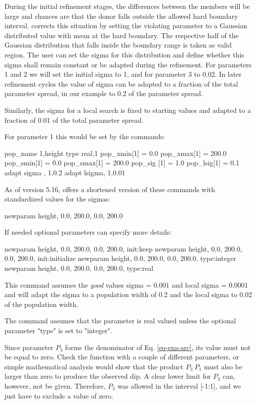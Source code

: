 During the initial refinement stages, the differences between the 
members will be large and chances are that the donor falls outside 
the allowed hard boundary interval. \Diffev corrects this situation by 
setting the violating parameter to a Gaussian distributed value 
with mean at the hard boundary. The respective half of the Gaussian
distribution that falls inside the boundary range is taken as valid
region. The user can set the sigma for this distribution and define
whether this sigma shall remain constant or be adapted during the
refinement. For parameters 1 and 2 we will set the initial sigma to
1, and for parameter 3 to 0.02. In later refinement cycles the
value of sigma can be adapted to a fraction of the total parameter 
spread, in our example to 0.2 of the parameter spread. 

Similarly, the sigma for a local search is fixed to starting values 
and adapted to a fraction of 0.01 of the total parameter spread.

For parameter 1 this would be set by the commands:
\begin{MacVerbatim}
   pop_name    1,height
   type real,1
   pop_xmin[1] =   0.0
   pop_xmax[1] = 200.0
   pop_smin[1] =   0.0
   pop_smax[1] = 200.0
   pop_sig [1] =   1.0
   pop_lsig[1] =   0.1
   adapt sigma , 1,0.2
   adapt lsigma, 1,0.01
\end{MacVerbatim}

As of version 5.16, \Diffev offers a shortened version of these 
commands with standardized values for the sigmas:
\begin{MacVerbatim}
   newparam height, 0.0, 200.0, 0.0, 200.0
\end{MacVerbatim}

If needed optional parameters can specify more details:
\begin{MacVerbatim}
   newparam height, 0.0, 200.0, 0.0, 200.0, init:keep
   newparam height, 0.0, 200.0, 0.0, 200.0, init:initialize
   newparam height, 0.0, 200.0, 0.0, 200.0, type:integer
   newparam height, 0.0, 200.0, 0.0, 200.0, type:real
\end{MacVerbatim}

This command assumes the {\it good} values sigma = 0.001 and 
local sigma = 0.0001 and will adapt the sigma to a population 
width of 0.2 and the local sigma to 0.02 of the population width.

The command assumes that the parameter is real valued unless the
optional parameter "type" is set to "integer".

Since parameter $P_{3}$ forms the denominator of Eq. \ref{eq-exa-arc},
its value must not be equal to zero. Check the function with a couple 
of different parameters, or simple mathematical analysis 
would show that the product $P_{3}~P_{1}$ must also be larger 
than zero to produce the observed dip. A clear lower limit for 
$P_{3}$ can, however, not be given. Therefore, $P_{3}$ was allowed 
in the interval [-1:1], and we just have to exclude a value of zero.


